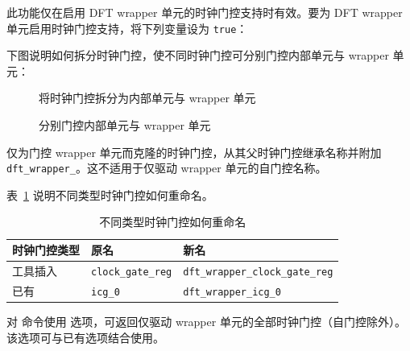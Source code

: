 此功能仅在启用 DFT wrapper 单元的时钟门控支持时有效。要为 DFT wrapper 单元启用时钟门控支持，将下列变量设为 \texttt{true}：
\begin{quote}
\end{quote}

下图说明如何拆分时钟门控，使不同时钟门控可分别门控内部单元与 wrapper 单元：

\begin{figure}[htbp]
\centering
{}
\caption{将时钟门控拆分为内部单元与 wrapper 单元}
\label{fig:cg-dft-split}
\end{figure}

\begin{figure}[htbp]
\centering
{}
\caption{分别门控内部单元与 wrapper 单元}
\label{fig:cg-dft-sep}
\end{figure}

\begin{noteBox}
仅为门控 wrapper 单元而克隆的时钟门控，从其父时钟门控继承名称并附加 \texttt{dft\_wrapper\_}。这不适用于仅驱动 wrapper 单元的自门控名称。
\end{noteBox}

表~\ref{tab:cg-dft-rename} 说明不同类型时钟门控如何重命名。

\begin{table}[htbp]
\centering
\caption{不同类型时钟门控如何重命名}
\label{tab:cg-dft-rename}
\begin{tabularx}{\textwidth}{@{}l l X@{}}
\toprule
\textbf{时钟门控类型} & \textbf{原名} & \textbf{新名} \\
\midrule
工具插入 & \texttt{clock\_gate\_reg} & \texttt{dft\_wrapper\_clock\_gate\_reg} \\
已有 & \texttt{icg\_0} & \texttt{dft\_wrapper\_icg\_0} \\
\bottomrule
\end{tabularx}
\end{table}

对  命令使用  选项，可返回仅驱动 wrapper 单元的全部时钟门控（自门控除外）。该选项可与已有选项结合使用。

